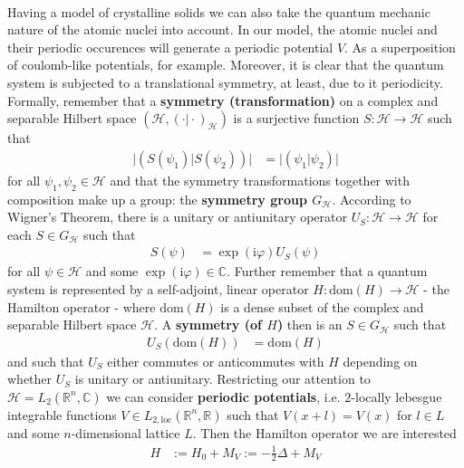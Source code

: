 \\
Having a model of crystalline solids we can also take the quantum mechanic nature of the atomic nuclei into account. In our model, the atomic nuclei and their periodic occurences will generate a periodic potential $V$. As a superposition of coulomb-like potentials, for example. Moreover, it is clear that the quantum system is subjected to a translational symmetry, at least, due to it periodicity.
\\
Formally, remember that a \textbf{symmetry (transformation)} on a complex and separable Hilbert space $(\mathcal{H},(\cdot \vert \cdot)_{\mathcal{H}})$ is a surjective function $S \colon \mathcal{H} \to \mathcal{H}$ such that
\begin{align*}
  \vert
    (S(\psi_{1}) \vert S(\psi_{2}))
  \vert
  &=
  \vert
    (\psi_{1} \vert \psi_{2})
  \vert
\end{align*}
for all $\psi_{1},\psi_{2} \in \mathcal{H}$ and that the symmetry transformations together with composition make up a group: the \textbf{symmetry group $G_{\mathcal{H}}$}. According to Wigner's Theorem, there is a unitary or antiunitary operator $U_{S} \colon \mathcal{H} \to \mathcal{H}$ for each $S \in G_{\mathcal{H}}$ such that
\begin{align*}
  S(\psi)
  &=
  \exp(\mathrm{i}\varphi) U_{S}(\psi)
\end{align*}
for all $\psi \in \mathcal{H}$ and some $\exp(\mathrm{i}\varphi) \in \mathbb{C}$. Further remember that a quantum system is represented by a self-adjoint, linear operator $H \colon \mathrm{dom}(H) \to \mathcal{H}$ - the Hamilton operator - where $\mathrm{dom}(H)$ is a dense subset of the complex and separable Hilbert space $\mathcal{H}$. A \textbf{symmetry (of $H$)} then is an $S \in G_{\mathcal{H}}$ such that
\begin{align*}
  U_{S}(\mathrm{dom}(H))
  &=
  \mathrm{dom}(H)
\end{align*}
and such that $U_{S}$ either commutes or anticommutes with $H$ depending on whether $U_{S}$ is unitary or antiunitary. Restricting our attention to $\mathcal{H} = L_{2}(\mathbb{R}^{n},\mathbb{C})$ we can consider \textbf{periodic potentials}, i.e. $2$-locally lebesgue integrable functions $V \in L_{2,\textrm{loc}}(\mathbb{R}^{n},\mathbb{R})$ such that $V(x + l) = V(x)$ for $l \in L$ and some $n$-dimensional lattice $L$. Then the Hamilton operator we are interested
\begin{align*}
  H
  &:=
  H_{0}
  +
  M_{V}
  :=
  -
  \frac{1}{2}
  \Delta
  +
  M_{V}
\end{align*}
